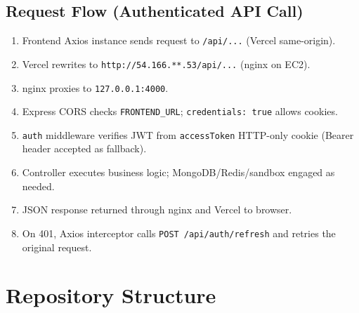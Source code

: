 \documentclass[11pt,a4paper]{article}
\newcommand{\maskedecip}{\texttt{54.166.**.53}}
\begin{document}
\subsection{Request Flow (Authenticated API Call)}
\begin{enumerate}[noitemsep]
  \item Frontend Axios instance sends request to \texttt{/api/...} (Vercel same-origin).
  \item Vercel rewrites to \texttt{http://\maskedecip/api/...} (nginx on EC2).
  \item nginx proxies to \texttt{127.0.0.1:4000}.
  \item Express CORS checks \texttt{FRONTEND\_URL}; \texttt{credentials: true} allows cookies.
  \item \texttt{auth} middleware verifies JWT from \texttt{accessToken} HTTP-only cookie (Bearer header accepted as fallback).
  \item Controller executes business logic; MongoDB/Redis/sandbox engaged as needed.
  \item JSON response returned through nginx and Vercel to browser.
  \item On 401, Axios interceptor calls \texttt{POST /api/auth/refresh} and retries the original request.
\end{enumerate}

\section{Repository Structure}
\end{document}
